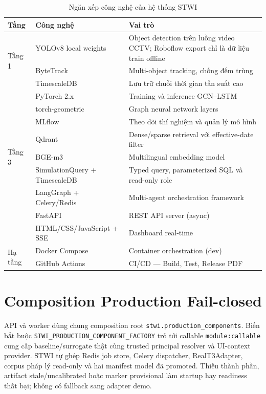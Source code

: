 \begin{table}[H]
\centering
\caption{Ngăn xếp công nghệ của hệ thống STWI}
\label{tab:techstack}
\renewcommand{\arraystretch}{1.4}
\begin{tabular}{p{2.5cm} p{3.5cm} p{6.2cm}}
\toprule
\textbf{Tầng} & \textbf{Công nghệ} & \textbf{Vai trò} \\
\midrule
\multirow{3}{*}{Tầng 1} & YOLOv8 local weights & Object detection trên luồng video CCTV; Roboflow export chỉ là dữ liệu train offline \\
  & ByteTrack & Multi-object tracking, chống đếm trùng \\
  & TimescaleDB & Lưu trữ chuỗi thời gian tần suất cao \\
\midrule
\rowcolor{rowgray}
\multirow{3}{*}{Tầng 2} & PyTorch 2.x & Training và inference GCN–LSTM \\
\rowcolor{rowgray}
  & torch-geometric & Graph neural network layers \\
\rowcolor{rowgray}
  & MLflow & Theo dõi thí nghiệm và quản lý mô hình \\
\midrule
\multirow{3}{*}{Tầng 3} & Qdrant & Dense/sparse retrieval với effective-date filter \\
  & BGE-m3 & Multilingual embedding model \\
  & SimulationQuery + TimescaleDB & Typed query, parameterized SQL và read-only role \\
\midrule
\rowcolor{rowgray}
\multirow{3}{*}{Tầng 4} & LangGraph + Celery/Redis & Multi-agent orchestration framework \\
\rowcolor{rowgray}
  & FastAPI & REST API server (async) \\
\rowcolor{rowgray}
  & HTML/CSS/JavaScript + SSE & Dashboard real-time \\
\midrule
\multirow{2}{*}{Hạ tầng} & Docker Compose & Container orchestration (dev) \\
  & GitHub Actions & CI/CD --- Build, Test, Release PDF \\
\bottomrule
\end{tabular}
\end{table}

\section{Composition Production Fail-closed}

API và worker dùng chung composition root \texttt{stwi.production\_components}.
Biến bắt buộc \texttt{STWI\_PRODUCTION\_COMPONENT\_FACTORY} trỏ tới callable
\texttt{module:callable} cung cấp baseline/surrogate thật cùng trusted principal
resolver và UI-context provider. STWI tự ghép Redis job store, Celery dispatcher,
RealT3Adapter, corpus pháp lý read-only và hai manifest model đã promoted. Thiếu
thành phần, artifact stale/uncalibrated hoặc marker provisional làm startup hay
readiness thất bại; không có fallback sang adapter demo.

